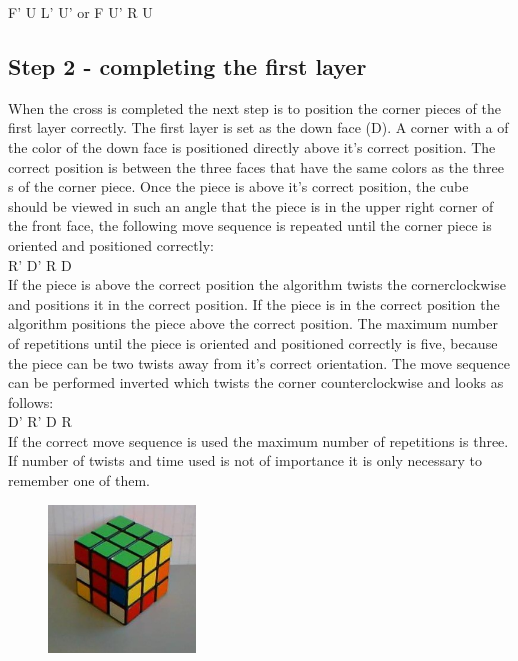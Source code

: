 F' U L' U' or F U' R U

\subsection{Step 2 - completing the first layer}
When the cross is completed the next step is to position the corner pieces of the first layer correctly. The first layer is set as the down face (D). A corner with a \facet{} of the color of the down face is positioned directly above it's correct  position. The correct position is between the three faces that have the same colors as the three \facet{}s of the corner piece. Once the piece is above it's correct position, the cube should be viewed in such an angle that the piece is in the upper right corner of the front face, the following move sequence is repeated until the corner piece is oriented and positioned correctly: \\

R' D' R D \\

If the piece is above the correct position the algorithm twists the cornerclockwise and positions it in the correct position. If the piece is in the correct position the algorithm positions the piece above the correct position. The maximum number of repetitions until the piece is oriented and positioned correctly is five, because the piece can be two twists away from it's correct orientation. 
The move sequence can be performed inverted which twists the corner counterclockwise and looks as follows: \\

D' R' D R \\

If the correct move sequence is used the maximum number of repetitions is three. If number of twists and time used is not of importance it is only necessary to remember one of them.

\begin{figure}
\begin{center}
	\includegraphics[width=0.35\textwidth]{input/pics/2FL.jpg}	
\end{center}
\caption{}
\label{fig:2FL}
\end{figure}

